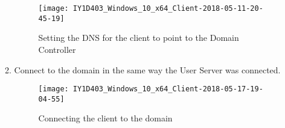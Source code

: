 \begin{enumerate}[series=task3methodology1]
\begin{enumerate}[label=(\alph*)]
        \begin{figure}[H]
          \centering
          \captionsetup{skip=2pt}
          \texttt{[image: IY1D403\_Windows\_10\_x64\_Client-2018-05-11-20-45-19]}
          \caption{Setting the DNS for the client to point to the Domain Controller}
          \label{fig:task3:win10client_03}
        \end{figure}
      \item Connect to the domain in the same way the User Server was connected.
        \begin{figure}[H]
          \centering
          \captionsetup{skip=2pt}
          \texttt{[image: IY1D403\_Windows\_10\_x64\_Client-2018-05-17-19-04-55]}
          \caption{Connecting the client to the domain}
          \label{fig:task3:win10client_04}
        \end{figure}
    \end{enumerate}
\end{enumerate}


